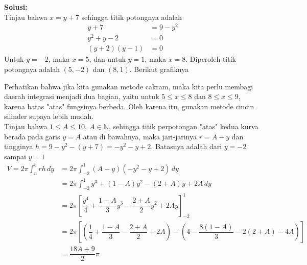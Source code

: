 \documentclass{article}
\begin{document}
\begin{enumerate}
	\textbf{Solusi:}\\
	Tinjau bahwa $x=y+7$ sehingga titik potongnya adalah
	\begin{align*}
	y+7 &=9-y^2\\
	y^2+y-2 &= 0\\
	(y+2)(y-1) &=0
	\end{align*}
	Untuk $y=-2$, maka $x=5$, dan untuk $y=1$, maka $x=8$. Diperoleh titik potongnya adalah $(5,-2)$ dan $(8,1)$. Berikut grafiknya
	\begin{center}
		\end{center}
		Perhatikan bahwa jika kita gunakan metode cakram, maka kita perlu membagi daerah integrasi menjadi dua bagian, yaitu untuk $5\leq x\leq 8$ dan $8\leq x\leq 9$, karena batas "atas" fungsinya berbeda. Oleh karena itu, gunakan metode cincin silinder supaya lebih mudah. \\
		Tinjau bahwa $1\leq A\leq 10,~ A\in \mathbb{N}$, sehingga titik perpotongan "atas" kedua kurva berada pada garis $y=A$ atau di bawahnya, maka jari-jarinya $r=A-y$ dan tingginya $h=9-y^2-(y+7)=-y^2-y+2$. Batasnya adalah dari $y=-2$ sampai $y=1$
		\begin{align*}
		V = 2\pi \int_a^b rh \, dy &= 2\pi \int_{-2}^1 (A-y)(-y^2-y+2) \, dy\\
		&= 2\pi \int_{-2}^1 y^3 +(1-A)y^2-(2+A)y+2A\, dy\\
		&= 2\pi \left[\dfrac{y^4}{4}+\dfrac{1-A}{3}y^3-\dfrac{2+A}{2}y^2+2Ay\right]^1_{-2}\\
		&= 2\pi\left[\left(\dfrac{1}{4}+\dfrac{1-A}{3}-\dfrac{2+A}{2}+2A\right)-\left(4-\dfrac{8(1-A)}{3}-2(2+A)-4A\right)\right]\\
		&= \dfrac{18A+9}{2}\pi
		\end{align*}
\end{enumerate}
\end{document}
